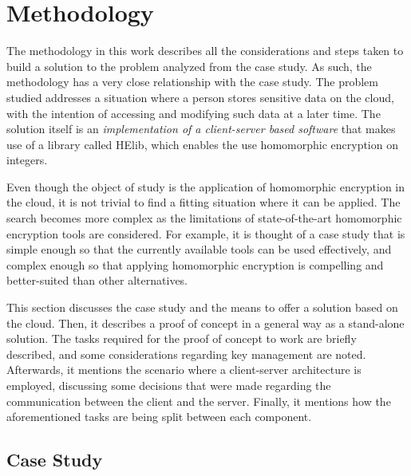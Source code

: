 \chapter{Methodology}
\label{methodology}

The methodology in this work describes all the considerations and steps taken to build a solution to the problem analyzed from the case study. As such, the methodology has a very close relationship with the case study. The problem studied addresses a situation where a person stores sensitive data on the cloud, with the intention of accessing and modifying such data at a later time. The solution itself is an \emph{implementation of a client-server based software} that makes use of a library called HElib, which enables the use homomorphic encryption on integers.

Even though the object of study is the application of homomorphic encryption in the cloud, it is not trivial to find a fitting situation where it can be applied. The search becomes more complex as the limitations of state-of-the-art homomorphic encryption tools are considered. For example, it is thought of a case study that is simple enough so that the currently available tools can be used effectively, and complex enough so that applying homomorphic encryption is compelling and better-suited than other alternatives.

This section discusses the case study and the means to offer a solution based on the cloud.  Then, it describes a proof of concept in a general way as a stand-alone solution. The tasks required for the proof of concept to work are briefly described, and some considerations regarding key management are noted. Afterwards, it mentions the scenario where a client-server architecture is employed, discussing some decisions that were made regarding the communication between the client and the server. Finally, it mentions how the aforementioned tasks are being split between each component.

\section{{Case Study}}

